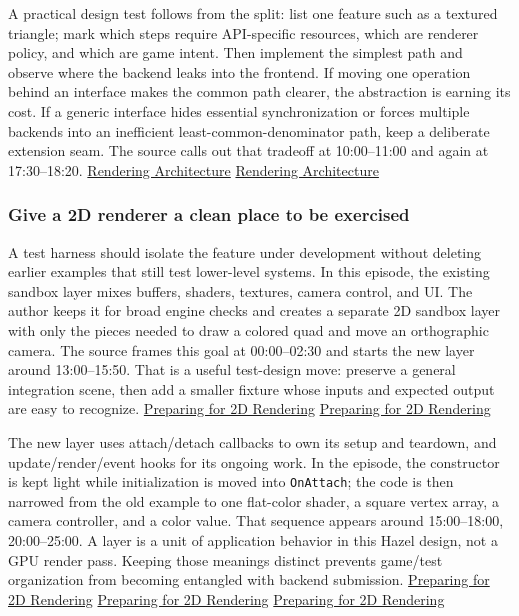A practical design test follows from the split: list one feature such as a textured triangle; mark which steps require API-specific resources, which are renderer policy, and which are game intent. Then implement the simplest path and observe where the backend leaks into the frontend. If moving one operation behind an interface makes the common path clearer, the abstraction is earning its cost. If a generic interface hides essential synchronization or forces multiple backends into an inefficient least-common-denominator path, keep a deliberate extension seam. The source calls out that tradeoff at 10:00--11:00 and again at 17:30--18:20. \href{https://www.youtube.com/watch?v=YPWNNmlIUIo&t=600s}{Rendering Architecture} \href{https://www.youtube.com/watch?v=YPWNNmlIUIo&t=1050s}{Rendering Architecture}

\subsubsection{Give a 2D renderer a clean place to be exercised}\label{give-a-2d-renderer-a-clean-place-to-be-exercised}

A test harness should isolate the feature under development without deleting earlier examples that still test lower-level systems. In this episode, the existing sandbox layer mixes buffers, shaders, textures, camera control, and UI. The author keeps it for broad engine checks and creates a separate 2D sandbox layer with only the pieces needed to draw a colored quad and move an orthographic camera. The source frames this goal at 00:00--02:30 and starts the new layer around 13:00--15:50. That is a useful test-design move: preserve a general integration scene, then add a smaller fixture whose inputs and expected output are easy to recognize. \href{https://www.youtube.com/watch?v=sEiZZ2APlDs&t=0s}{Preparing for 2D Rendering} \href{https://www.youtube.com/watch?v=sEiZZ2APlDs&t=780s}{Preparing for 2D Rendering}

The new layer uses attach/detach callbacks to own its setup and teardown, and update/render/event hooks for its ongoing work. In the episode, the constructor is kept light while initialization is moved into \texttt{OnAttach}; the code is then narrowed from the old example to one flat-color shader, a square vertex array, a camera controller, and a color value. That sequence appears around 15:00--18:00, 20:00--25:00. A layer is a unit of application behavior in this Hazel design, not a GPU render pass. Keeping those meanings distinct prevents game/test organization from becoming entangled with backend submission. \href{https://www.youtube.com/watch?v=sEiZZ2APlDs&t=900s}{Preparing for 2D Rendering} \href{https://www.youtube.com/watch?v=sEiZZ2APlDs&t=1200s}{Preparing for 2D Rendering} \href{https://www.youtube.com/watch?v=sEiZZ2APlDs&t=1380s}{Preparing for 2D Rendering}

